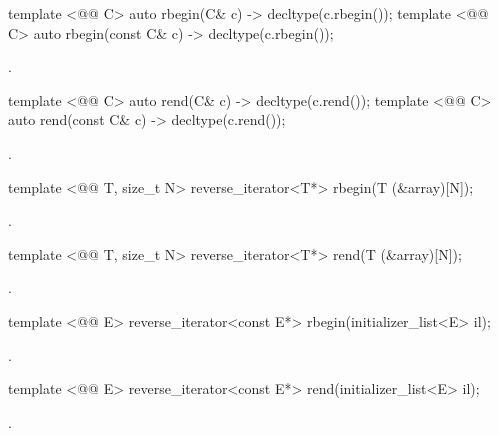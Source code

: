 %
\begin{itemdecl}
template <@@ C> auto rbegin(C& c) -> decltype(c.rbegin());
template <@@ C> auto rbegin(const C& c) -> decltype(c.rbegin());
\end{itemdecl}
\begin{itemdescr}
\pnum \returns {}.
\end{itemdescr}

%
\begin{itemdecl}
template <@@ C> auto rend(C& c) -> decltype(c.rend());
template <@@ C> auto rend(const C& c) -> decltype(c.rend());
\end{itemdecl}
\begin{itemdescr}
\pnum \returns {}.
\end{itemdescr}

%
\begin{itemdecl}
template <@@ T, size_t N> reverse_iterator<T*> rbegin(T (&array)[N]);
\end{itemdecl}
\begin{itemdescr}
\pnum \returns {}.
\end{itemdescr}

%
\begin{itemdecl}
template <@@ T, size_t N> reverse_iterator<T*> rend(T (&array)[N]);
\end{itemdecl}
\begin{itemdescr}
\pnum \returns {}.
\end{itemdescr}

%
\begin{itemdecl}
template <@@ E> reverse_iterator<const E*> rbegin(initializer_list<E> il);
\end{itemdecl}
\begin{itemdescr}
\pnum \returns {}.
\end{itemdescr}

%
\begin{itemdecl}
template <@@ E> reverse_iterator<const E*> rend(initializer_list<E> il);
\end{itemdecl}
\begin{itemdescr}
\pnum \returns {}.
\end{itemdescr}

